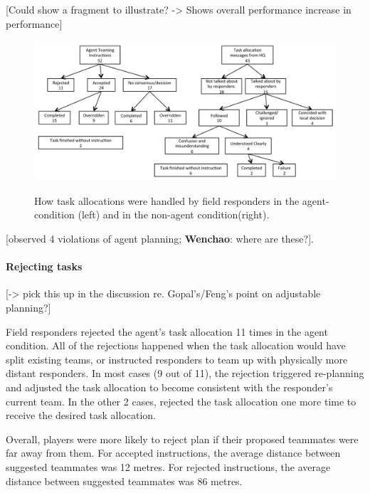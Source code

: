 [Could show a fragment to illustrate? -> Shows overall performance increase in performance]


\begin{figure}[htbp]
\includegraphics[width=\columnwidth]{message_handling.png}
\label{fig:msgs}
\caption{How task allocations were handled by field responders in the agent-condition (left) and in the non-agent condition(right).}
\end{figure}

[observed 4 violations of agent planning; \textbf{Wenchao}: where are these?]. 

\paragraph{Rejecting tasks}
[-> pick this up in the discussion re. Gopal's/Feng's point on adjustable planning?]

Field responders rejected the agent's task allocation 11 times in the agent condition. All of the rejections happened when the task allocation would have split existing teams, or instructed responders to team up with physically more distant responders. In most cases (9 out of 11), the rejection triggered re-planning and adjusted the task allocation to become consistent with the responder's current team. In the other 2 cases, rejected the task allocation one more time to receive the desired task allocation. 

Overall, players were more likely to reject plan if their proposed teammates were far away from them. For accepted instructions, the average distance between suggested teammates was 12 metres. For rejected instructions, the average distance between suggested teammates was 86 metres.

